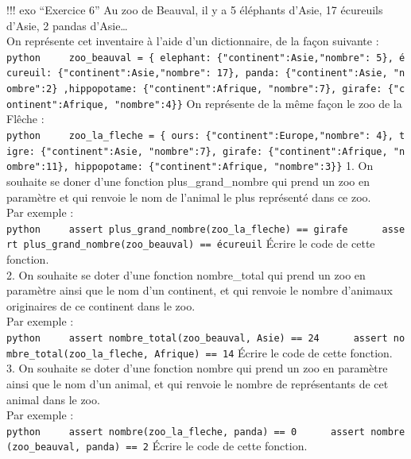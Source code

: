 \documentclass[
]{article}
\begin{document}
!!! exo ``Exercice 6'' Au zoo de Beauval, il y a 5 éléphants d'Asie, 17
écureuils d'Asie, 2 pandas d'Asie\ldots{}\\
On représente cet inventaire à l'aide d'un dictionnaire, de la façon
suivante :
\texttt{python\ \ \ \ \ zoo\_beauval\ =\ \{\ \textquotesingle{}elephant\textquotesingle{}:\ \{"continent":\textquotesingle{}Asie\textquotesingle{},"nombre":\ 5\},\ \textquotesingle{}écureuil\textquotesingle{}:\ \{"continent":\textquotesingle{}Asie\textquotesingle{},"nombre":\ 17\},\ \textquotesingle{}panda\textquotesingle{}:\ \{"continent":\textquotesingle{}Asie\textquotesingle{},\ "nombre":2\}\ ,\textquotesingle{}hippopotame\textquotesingle{}:\ \{"continent":\textquotesingle{}Afrique\textquotesingle{},\ "nombre":7\},\ \textquotesingle{}girafe\textquotesingle{}:\ \{"continent":\textquotesingle{}Afrique\textquotesingle{},\ "nombre":4\}\}}
On représente de la même façon le zoo de la Flêche :
\texttt{python\ \ \ \ \ zoo\_la\_fleche\ =\ \{\ \textquotesingle{}ours\textquotesingle{}:\ \{"continent":\textquotesingle{}Europe\textquotesingle{},"nombre":\ 4\},\ \textquotesingle{}tigre\textquotesingle{}:\ \{"continent":\textquotesingle{}Asie\textquotesingle{},\ "nombre":7\},\ \textquotesingle{}girafe\textquotesingle{}:\ \{"continent":\textquotesingle{}Afrique\textquotesingle{},\ "nombre":11\},\ \textquotesingle{}hippopotame\textquotesingle{}:\ \{"continent":\textquotesingle{}Afrique\textquotesingle{},\ "nombre":3\}\}}
1. On souhaite se doner d'une fonction plus\_grand\_nombre qui prend un
zoo en paramètre et qui renvoie le nom de l'animal le plus représenté
dans ce zoo.\\
Par exemple :
\texttt{python\ \ \ \ \ assert\ plus\_grand\_nombre(zoo\_la\_fleche)\ ==\ \textquotesingle{}girafe\textquotesingle{}\ \ \ \ \ \ assert\ plus\_grand\_nombre(zoo\_beauval)\ ==\ \textquotesingle{}écureuil\textquotesingle{}}
Écrire le code de cette fonction.\\
2. On souhaite se doter d'une fonction nombre\_total qui prend un zoo en
paramètre ainsi que le nom d'un continent, et qui renvoie le nombre
d'animaux originaires de ce continent dans le zoo.\\
Par exemple :
\texttt{python\ \ \ \ \ assert\ nombre\_total(zoo\_beauval,\ \textquotesingle{}Asie\textquotesingle{})\ ==\ 24\ \ \ \ \ \ assert\ nombre\_total(zoo\_la\_fleche,\ \textquotesingle{}Afrique\textquotesingle{})\ ==\ 14}
Écrire le code de cette fonction.\\
3. On souhaite se doter d'une fonction nombre qui prend un zoo en
paramètre ainsi que le nom d'un animal, et qui renvoie le nombre de
représentants de cet animal dans le zoo.\\
Par exemple :
\texttt{python\ \ \ \ \ assert\ nombre(zoo\_la\_fleche,\ \textquotesingle{}panda\textquotesingle{})\ ==\ 0\ \ \ \ \ \ assert\ nombre(zoo\_beauval,\ \textquotesingle{}panda\textquotesingle{})\ ==\ 2}
Écrire le code de cette fonction.
\end{document}
